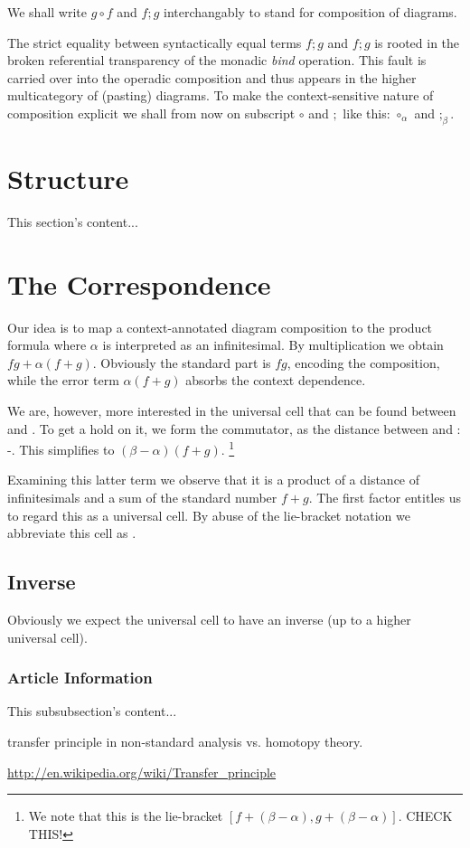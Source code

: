 \documentclass{article}
\begin{document}
We shall write $g \circ f$ and $f;g$ interchangably to stand for
composition of diagrams.

The strict equality between syntactically equal terms $f;g$ and $f;g$
is rooted in the broken referential transparency of the monadic
\emph{bind} operation. This fault is carried over into the operadic
composition and thus appears in the higher multicategory of (pasting)
diagrams. To make the context-sensitive nature of composition explicit
we shall from now on subscript $\circ$ and $;$ like this: ${\circ_\alpha}$
and ${;_\beta}$.

\section{Structure}
This section's content...

\section{The Correspondence}

Our idea is to map a context-annotated diagram composition 
to the product formula  where $\alpha$ is interpreted as
an infinitesimal. By multiplication we obtain $fg+\alpha(f+g)$. Obviously the
standard part is $fg$, encoding the composition, while the error term $\alpha(f+g)$
absorbs the context dependence.

We are, however, more interested in the universal cell that can be found between
  and . To get a hold on it, we form the
commutator, as the distance between  and :
-. This simplifies to $(\beta-\alpha)(f+g)$.
\footnote{We note that this is the lie-bracket $[f+(\beta-\alpha), g+(\beta-\alpha)]$. CHECK THIS!}

Examining this latter term we observe that it is a product of a distance of infinitesimals
and a sum of the standard number $f+g$. The first factor entitles us to regard this as a
universal cell. By abuse of the lie-bracket notation we abbreviate this cell as
.

\subsection{Inverse}

Obviously we expect the universal cell to have an inverse (up to a higher universal cell).



\subsubsection{Article Information}
This subsubsection's content...


transfer principle in non-standard analysis vs. homotopy theory.

\url{http://en.wikipedia.org/wiki/Transfer_principle}
\end{document}
